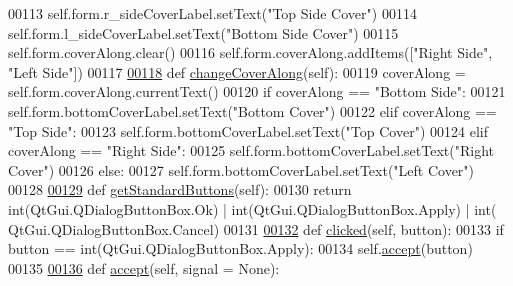\begin{DoxyCode}
00113             self.form.r\_sideCoverLabel.setText(\textcolor{stringliteral}{"Top Side Cover"})
00114             self.form.l\_sideCoverLabel.setText(\textcolor{stringliteral}{"Bottom Side Cover"})
00115             self.form.coverAlong.clear()
00116             self.form.coverAlong.addItems([\textcolor{stringliteral}{"Right Side"}, \textcolor{stringliteral}{"Left Side"}])
00117 
\hypertarget{StraightRebar_8py_source.tex_l00118}{}\hyperlink{classStraightRebar_1_1__StraightRebarTaskPanel_ae99010cf766375812bf24f80cd3f60e1}{00118}     \textcolor{keyword}{def }\hyperlink{classStraightRebar_1_1__StraightRebarTaskPanel_ae99010cf766375812bf24f80cd3f60e1}{changeCoverAlong}(self):
00119         coverAlong = self.form.coverAlong.currentText()
00120         \textcolor{keywordflow}{if} coverAlong == \textcolor{stringliteral}{"Bottom Side"}:
00121             self.form.bottomCoverLabel.setText(\textcolor{stringliteral}{"Bottom Cover"})
00122         \textcolor{keywordflow}{elif} coverAlong == \textcolor{stringliteral}{"Top Side"}:
00123             self.form.bottomCoverLabel.setText(\textcolor{stringliteral}{"Top Cover"})
00124         \textcolor{keywordflow}{elif} coverAlong == \textcolor{stringliteral}{"Right Side"}:
00125             self.form.bottomCoverLabel.setText(\textcolor{stringliteral}{"Right Cover"})
00126         \textcolor{keywordflow}{else}:
00127             self.form.bottomCoverLabel.setText(\textcolor{stringliteral}{"Left Cover"})
00128 
\hypertarget{StraightRebar_8py_source.tex_l00129}{}\hyperlink{classStraightRebar_1_1__StraightRebarTaskPanel_a657fa849f5c787db2303dac9024d8a98}{00129}     \textcolor{keyword}{def }\hyperlink{classStraightRebar_1_1__StraightRebarTaskPanel_a657fa849f5c787db2303dac9024d8a98}{getStandardButtons}(self):
00130         \textcolor{keywordflow}{return} int(QtGui.QDialogButtonBox.Ok) | int(QtGui.QDialogButtonBox.Apply) | int(
      QtGui.QDialogButtonBox.Cancel)
00131 
\hypertarget{StraightRebar_8py_source.tex_l00132}{}\hyperlink{classStraightRebar_1_1__StraightRebarTaskPanel_a8190e8acf6121a5fe3b58d968ef17300}{00132}     \textcolor{keyword}{def }\hyperlink{classStraightRebar_1_1__StraightRebarTaskPanel_a8190e8acf6121a5fe3b58d968ef17300}{clicked}(self, button):
00133         \textcolor{keywordflow}{if} button == int(QtGui.QDialogButtonBox.Apply):
00134             self.\hyperlink{classStraightRebar_1_1__StraightRebarTaskPanel_ad8a49d3d30ef3308b8386c9ebe1b67d8}{accept}(button)
00135 
\hypertarget{StraightRebar_8py_source.tex_l00136}{}\hyperlink{classStraightRebar_1_1__StraightRebarTaskPanel_ad8a49d3d30ef3308b8386c9ebe1b67d8}{00136}     \textcolor{keyword}{def }\hyperlink{classStraightRebar_1_1__StraightRebarTaskPanel_ad8a49d3d30ef3308b8386c9ebe1b67d8}{accept}(self, signal = None):

\end{DoxyCode}
